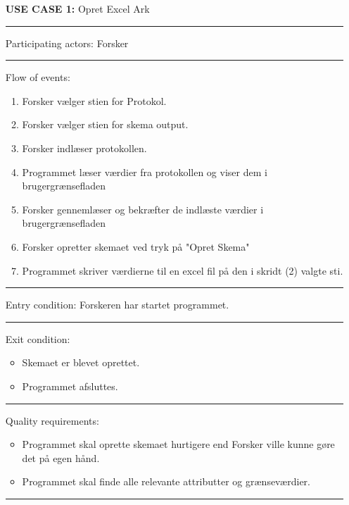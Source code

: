 \documentclass[11pt]{article}
\begin{document}
\begin{itemize}
\item[\textbf{USE CASE 1:}] Opret Excel Ark\\
\noindent\rule{14cm}{0.4pt}

\item [Participating actors:] \quad Forsker \\
\noindent\rule{14cm}{0.4pt}


\item [Flow of events:]
\begin{enumerate}
\item Forsker vælger stien for Protokol.
\item Forsker vælger stien for skema output.
\item Forsker indlæser protokollen.
\item Programmet læser værdier fra protokollen og viser dem i brugergrænsefladen
\item Forsker gennemlæser og bekræfter de indlæste værdier i brugergrænsefladen
\item Forsker opretter skemaet ved tryk på "Opret Skema"
\item Programmet skriver værdierne til en excel fil på den i skridt (2) valgte sti.
\end{enumerate}
\noindent\rule{14cm}{0.4pt}
\item[Entry condition:] Forskeren har startet programmet.\\
\noindent\rule{14cm}{0.4pt}

\item[Exit condition:]
\begin{itemize}
  \item Skemaet er blevet oprettet.
  \item Programmet afsluttes.
\end{itemize}
\noindent\rule{14cm}{0.4pt}
\item[Quality requirements:]
\begin{itemize}
\item Programmet skal oprette skemaet hurtigere end Forsker ville kunne gøre det på egen hånd.
\item Programmet skal finde alle relevante attributter og grænseværdier.
\end{itemize}

\noindent\rule{14cm}{0.4pt} \hfill \\

\end{itemize}
\end{document}
